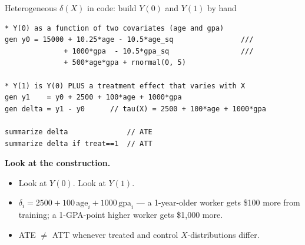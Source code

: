 \documentclass[aspectratio=169,11pt]{beamer}
\begin{document}
\begin{frame}[fragile]{Heterogeneous $\delta(X)$ in code: build $Y(0)$ and $Y(1)$ by hand}
\footnotesize
\begin{lstlisting}[language={[ANSI]C},basicstyle=\ttfamily\scriptsize]
* Y(0) as a function of two covariates (age and gpa)
gen y0 = 15000 + 10.25*age - 10.5*age_sq                ///
              + 1000*gpa  - 10.5*gpa_sq                 ///
              + 500*age*gpa + rnormal(0, 5)

* Y(1) is Y(0) PLUS a treatment effect that varies with X
gen y1    = y0 + 2500 + 100*age + 1000*gpa
gen delta = y1 - y0      // tau(X) = 2500 + 100*age + 1000*gpa

summarize delta              // ATE
summarize delta if treat==1  // ATT
\end{lstlisting}

\vspace{0.4em}
\textbf{Look at the construction.}
\begin{itemize}\setlength\itemsep{1pt}
  \item Look at $Y(0)$. \;Look at $Y(1)$. \;
  \item $\delta_i = 2500 + 100\,\text{age}_i + 1000\,\text{gpa}_i$ --- a 1-year-older worker gets \$100 more from training; a 1-GPA-point higher worker gets \$1{,}000 more.
  \item ATE $\neq$ ATT whenever treated and control $X$-distributions differ. \;\;
\end{itemize}
\end{frame}
\end{document}
